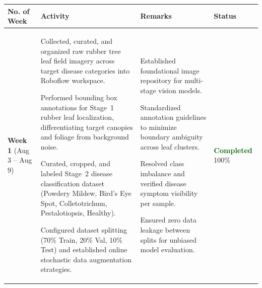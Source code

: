 \documentclass[10pt,a4paper]{article}
\begin{document}
\renewcommand{\arraystretch}{1.4}
\begin{tabularx}{\textwidth}{@{} p{2.2cm} >{\raggedright\arraybackslash}X >{\raggedright\arraybackslash}X p{2.0cm} @{}}
\toprule
\textbf{No. of Week} & \textbf{Activity} & \textbf{Remarks} & \textbf{Status} \\
\midrule

\textbf{Week 1}\newline
\footnotesize{(Aug 3 -- Aug 9)} & 
\begin{tableitems}
    \item Collected, curated, and organized raw rubber tree leaf field imagery across target disease categories into Roboflow workspace.
    \item Performed bounding box annotations for Stage~1 rubber leaf localization, differentiating target canopies and foliage from background noise.
    \item Curated, cropped, and labeled Stage~2 disease classification dataset (Powdery Mildew, Bird's Eye Spot, Colletotrichum, Pestalotiopsis, Healthy).
    \item Configured dataset splitting (70\% Train, 20\% Val, 10\% Test) and established online stochastic data augmentation strategies.
\end{tableitems} & 
\begin{tableitems}
    \item Established foundational image repository for multi-stage vision models.
    \item Standardized annotation guidelines to minimize boundary ambiguity across leaf clusters.
    \item Resolved class imbalance and verified disease symptom visibility per sample.
    \item Ensured zero data leakage between splits for unbiased model evaluation.
\end{tableitems} & 
\textcolor{darkgreen}{\textbf{Completed}}\newline
\footnotesize{100\%} \\

\midrule


\end{tabularx}
\end{document}

